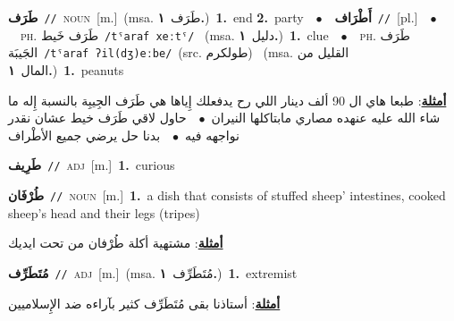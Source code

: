 \documentclass[10pt,a4paper,twoside]{article} %
\begin{document}
\begin{multicols}{2}
{\setlength\topsep{0pt}\textbf{\foreignlanguage{arabic}{طَرَف}}\ {\color{gray}\texttt{//}\color{black}}\ \textsc{noun}\ [m.]\ \color{gray}(msa. \foreignlanguage{arabic}{طَرَف}~\foreignlanguage{arabic}{\textbf{١.}})\color{black}\ \textbf{1.}~end  \textbf{2.}~party\ \ $\bullet$\ \ \setlength\topsep{0pt}\textbf{\foreignlanguage{arabic}{أَطْرَاف}}\ {\color{gray}\texttt{//}\color{black}}\ [pl.]\ \ $\bullet$\ \ \textsc{ph.} \color{gray} \foreignlanguage{arabic}{طَرَف خَيط}\color{black}\ {\color{gray}\texttt{/{\sffamily tˤaraf xeːtˤ}/}\color{black}}\ \color{gray} (msa. \foreignlanguage{arabic}{دليل}~\foreignlanguage{arabic}{\textbf{١.}})\color{black}\ \textbf{1.}~clue\ \ $\bullet$\ \ \textsc{ph.} \color{gray} \foreignlanguage{arabic}{طَرَف الجَيبَة}\color{black}\ {\color{gray}\texttt{/{\sffamily tˤaraf ʔil(dʒ)eːbe}/}\color{black}}\ \color{gray}(src. \foreignlanguage{arabic}{طولكرم})\color{black}\ \color{gray} (msa. \foreignlanguage{arabic}{القليل من المال}~\foreignlanguage{arabic}{\textbf{١.}})\color{black}\ \textbf{1.}~peanuts\  \begin{flushright}\color{gray}\foreignlanguage{arabic}{\textbf{\underline{\foreignlanguage{arabic}{أمثلة}}}: طبعا هاي ال 90 ألف دينار اللي رح يدفعلك إِياها هي طَرَف الجِيبِة بالنسبة إِله ما شاء الله عليه عنهده مصاري مابتاكلها النيران\ $\bullet$\ \  حاول لاقي طَرَف خيط عشان نقدر نواجهه فيه\ $\bullet$\ \  بدنا حل يرضي جميع الأطْراف}\end{flushright}\color{black}} \vspace{2mm}

{\setlength\topsep{0pt}\textbf{\foreignlanguage{arabic}{طَرِيف}}\ {\color{gray}\texttt{//}\color{black}}\ \textsc{adj}\ [m.]\ \textbf{1.}~curious\ } \vspace{2mm}

{\setlength\topsep{0pt}\textbf{\foreignlanguage{arabic}{طُرْفَان}}\ {\color{gray}\texttt{//}\color{black}}\ \textsc{noun}\ [m.]\ \textbf{1.}~a dish that consists of stuffed sheep' intestines, cooked sheep's head and their legs (tripes)\  \begin{flushright}\color{gray}\foreignlanguage{arabic}{\textbf{\underline{\foreignlanguage{arabic}{أمثلة}}}: مشتهية أكلة طُرْفان من تحت ايديك}\end{flushright}\color{black}} \vspace{2mm}

{\setlength\topsep{0pt}\textbf{\foreignlanguage{arabic}{مُتَطَرِّف}}\ {\color{gray}\texttt{//}\color{black}}\ \textsc{adj}\ [m.]\ \color{gray}(msa. \foreignlanguage{arabic}{مُتَطَرِّف}~\foreignlanguage{arabic}{\textbf{١.}})\color{black}\ \textbf{1.}~extremist\  \begin{flushright}\color{gray}\foreignlanguage{arabic}{\textbf{\underline{\foreignlanguage{arabic}{أمثلة}}}: أستاذنا بقى مُتَطَرِّف كثير بآراءه ضد الإِسلاميين}\end{flushright}\color{black}} \vspace{2mm}


\end{multicols}
\end{document}
